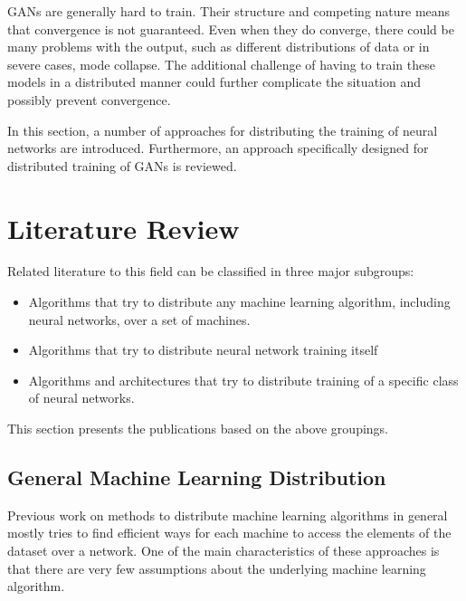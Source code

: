 \documentclass[11pt]{article}       %
\begin{document}
GANs are generally hard to train.\cite{mescheder2018training} Their structure and competing nature means that convergence is not guaranteed. Even when they do converge, there could be many problems with the output, such as different distributions of data or in severe cases, mode collapse. The additional challenge of having to train these models in a distributed manner could further complicate the situation and possibly prevent convergence.

In this section, a number of approaches for distributing the training of neural networks are introduced. Furthermore, an approach specifically designed for distributed training of GANs is reviewed.

\section{Literature Review} \label{litrev}

Related literature to this field can be classified in three major subgroups:
\begin{itemize}
\item Algorithms that try to distribute any machine learning algorithm, including neural networks, over a set of machines.
\item Algorithms that try to distribute neural network training itself
\item Algorithms and architectures that try to distribute training of a specific class of neural networks.
\end{itemize}

This section presents the publications based on the above groupings.

\subsection{General Machine Learning Distribution}

Previous work on methods to distribute machine learning algorithms in general mostly tries to find efficient ways for each machine to access the elements of the dataset over a network. One of the main characteristics of these approaches is that there are very few assumptions about the underlying machine learning algorithm.
\end{document}
